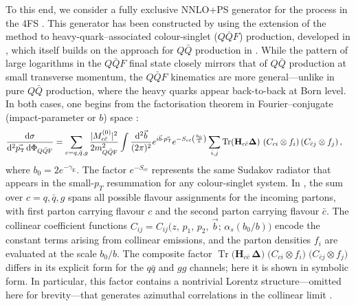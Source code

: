 \documentclass[11pt,a4paper]{article}
\DeclareMathOperator{\Tr}{Tr}
\begin{document}
To this end, we consider a fully exclusive NNLO+PS generator for the \bbH{} process in the 4FS \cite{Biello:2024pgo}.  This generator has been constructed by using 
the extension of the \minnlo{} method to heavy-quark–associated colour-singlet ($Q\bar{Q}F$) production, developed in , 
which itself builds on the \minnlo{} approach for $Q\bar{Q}$ production in . 
While the pattern of large logarithms in the \(Q\bar{Q}F\) final state closely mirrors that of \(Q\bar{Q}\) production at small transverse momentum, the \(Q\bar{Q}F\) kinematics are more general—unlike in pure \(Q\bar{Q}\) production, where the heavy quarks appear back-to-back at Born level.  In both cases, one begins from the factorisation theorem in Fourier–conjugate (impact-parameter or \(b\)) space \cite{Zhu:2012ts,Li:2013mia,Catani:2014qha,Catani:2018mei}:
\begin{align}\label{eq:facformula}
        \frac{\mathd \sigma}{ \mathd^2\vec{\pt}\, \mathd \Phi_{Q\bar{Q}{\rm F}}}&=\sum_{c=q,\bar{q},g}
  \frac{|M^{(0)}_{c\bar{c}}|^2}{2 m_{Q\bar{Q}{\rm F}}^2 }\int\frac{ \mathd^2\vec{b}}{(2\pi)^2} e^{i \vec{b}\cdot
  \vec{\pt} } e^{-S_{c\bar{c}} \left(\frac{b_0}{b}\right)}\sum_{i,j} \Tr({\mathbf H}_{c\bar{c}}{\mathbf \Delta})\,\,
  ({C}_{ci}\otimes f_i) \,({C}_{\bar{c} j}\otimes f_j) \,,
\end{align}
where $b_0=2 e^{-\gamma_\text{E}}$. The factor $e^{-S_{c\bar{c}}}$ represents the same Sudakov radiator that appears in the small-$p_{T}$ resummation for any colour-singlet system.  In , the sum over $c=q,\bar{q},g$ spans all possible flavour assignments for the incoming partons, with first parton carrying flavour $c$ and the second parton carrying flavour $\bar{c}$. The collinear coefficient functions
$C_{ij} = C_{ij}\bigl(z,\,p_{1},\,p_{2},\,\vec{b};\,\alpha_{s}(b_{0}/b)\bigr)$
encode the constant terms arising from collinear emissions, and the parton densities $f_{i}$ are evaluated at the scale $b_{0}/b$.  The composite factor
$\Tr\bigl({\mathbf H}_{c\bar{c}}\,{\mathbf \Delta}\bigr)\;\bigl(C_{ci}\otimes f_{i}\bigr)\;\bigl(C_{\bar{c}j}\otimes f_{j}\bigr)$
differs in its explicit form for the $q\bar{q}$ and $gg$ channels; here it is shown in symbolic form.  In particular, this factor contains a nontrivial Lorentz structure—omitted here for brevity—that generates azimuthal correlations in the collinear limit \cite{Catani:2010pd,Catani:2014qha}.
\end{document}
